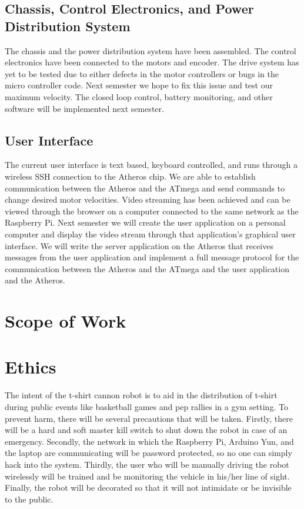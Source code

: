 \documentclass[letterpaper,12pt]{article}
\begin{document}
\subsection{Chassis, Control Electronics, and Power Distribution System}
\noindent The chassis and the power distribution system have been assembled. The control electronics have been connected to the motors and encoder. The drive system has yet to be tested due to either defects in the motor controllers or bugs in the micro controller code. Next semester we hope to fix this issue and test our maximum velocity. The closed loop control, battery monitoring, and other software will be implemented next semester.\\

\subsection{User Interface}
\noindent The current user interface is text based, keyboard controlled, and runs through a wireless SSH connection to the Atheros chip. We are able to establish communication between the Atheros and the ATmega and send commands to change desired motor velocities. Video streaming has been achieved and can be viewed through the browser on a computer connected to the same network as the Raspberry Pi. Next semester we will create the user application on a personal computer and display the video stream through that application’s graphical user interface. We will write the server application on the Atheros that receives messages from the user application and implement a full message protocol for the communication between the Atheros and the ATmega and the user application and the Atheros. \\

\section{Scope of Work}
\section{Ethics}
\noindent The intent of the t-shirt cannon robot is to aid in the distribution of t-shirt during public events like basketball games and pep rallies in a gym setting. To prevent harm, there will be several precautions that will be taken. Firstly, there will be a hard and soft master kill switch to shut down the robot in case of an emergency. Secondly, the network in which the Raspberry Pi, Arduino Yun, and the laptop are communicating will be password protected, so no one can simply hack into the system. Thirdly, the user who will be manually driving the robot wirelessly will be trained and be monitoring the vehicle in his/her line of sight. Finally, the robot will be decorated so that it will not intimidate or be invisible to the public. 
\end{document}
